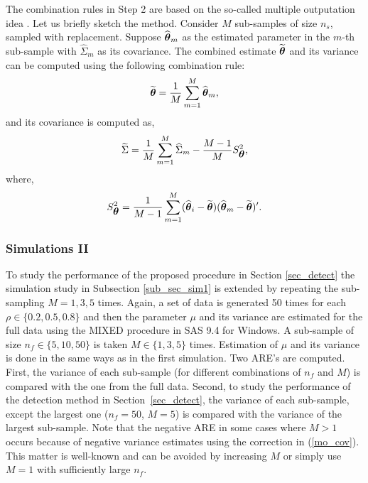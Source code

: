 \documentclass[11pt,a5paper,twoside]{book}
\newcommand{\bftheta}{\mbox{\boldmath $\theta$}}
\begin{document}
The combination rules in Step 2 are based on the so-called multiple outputation idea \cite{hoffman2001,follmann2003}. Let us briefly sketch the method. Consider $M$ sub-samples of size $n_s$, sampled with replacement. Suppose $\widehat{\bftheta}_m$ as the estimated parameter in the $m$-th sub-sample with $\widehat{\Sigma}_m$ as its covariance. The combined estimate $\widetilde{\bftheta}$ and its variance can be computed using the following combination rule:
\begin{equation}
\label{mo_estimate}
\widetilde{\bftheta}=\frac{1}{M}\sum_{m=1}^M \widehat{\bftheta}_m,
\end{equation}
and its covariance is computed as,
\begin{equation}
\label{mo_cov}
\widetilde{\Sigma} = \frac{1}{M}\sum_{m=1}^M \widehat{\Sigma}_m - \frac{M-1}{M}S^2_{\bftheta},
\end{equation}
where,
\begin{equation}
\label{mo_s2}
S^2_{\bftheta} = \frac{1}{M-1} \sum_{m=1}^M (\widehat{\bftheta}_i-\widetilde{\bftheta}) (\widehat{\bftheta}_m-\widetilde{\bftheta})'.
\end{equation}





\subsubsection{Simulations II}
\label{sub_sec_sim2}
To study the performance of the proposed procedure in Section \ref{sec_detect} the simulation study in Subsection \ref{sub_sec_sim1} is extended by repeating the sub-sampling $M=1,3,5$ times. Again, a set of data is generated 50 times for each $\rho\in\{0.2,0.5,0.8\}$ and then the parameter $\mu$ and its variance are estimated for the full data using the MIXED procedure in SAS 9.4 for Windows. A sub-sample of size $n_f\in \{5,10,50\}$ is taken $M\in\{1,3,5\}$ times. Estimation of  $\mu$ and its variance is done in the same ways as in the first simulation. Two ARE's are computed. First, the variance of each sub-sample (for different combinations of $n_f$ and $M$) is compared with the one from the full data. Second, to study the performance of the detection method in Section~\ref{sec_detect}, the variance of each sub-sample, except the largest one ($n_f=50$, $M=5$) is compared with the variance of the largest sub-sample. Note that the negative ARE in some cases where $M>1$ occurs because of negative variance estimates using the correction in (\ref{mo_cov}). This matter is well-known \cite{follmann2003} and can be avoided by increasing $M$ or simply use $M=1$ with sufficiently large $n_f$.
\end{document}
